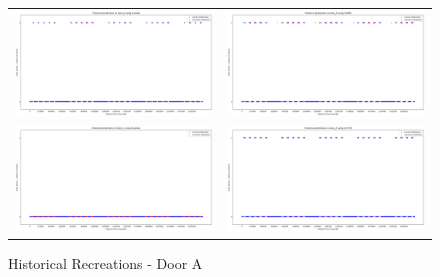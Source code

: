 \begin{figure}
  \begin{tabular}{cc}
    {\includegraphics[width = 3in]{images/results/Historical_door_A_Duckett.png}} &
    {\includegraphics[width = 3in]{images/results/Historical_door_A_FreMEn.png}} \\
    {\includegraphics[width = 3in]{images/results/Historical_door_A_Gaussian.png}} &
    {\includegraphics[width = 3in]{images/results/Historical_door_A_HyT-EM.png}} \\
  \end{tabular}
  \caption{Historical Recreations - Door A}
\end{figure} \\ \\

